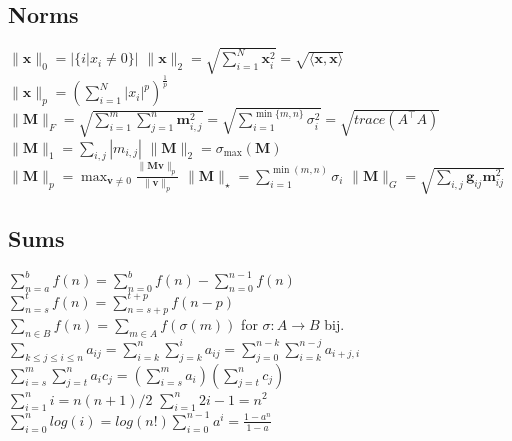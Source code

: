 \subsection*{Norms}
$\|\mathbf{x}\|_0 = |\{i | x_i \neq 0\}|$ \qquad $\|\mathbf{x}\|_2 = \sqrt{\sum_{i=1}^{N} \mathbf{x}_i^2} = \sqrt{\langle \mathbf{x}, \mathbf{x} \rangle}$\\
$\|\mathbf{x}\|_p = \left( \sum_{i=1}^{N} |x_i|^p \right)^{\frac{1}{p}}$\\
$\|\mathbf{M}\|_F =\allowbreak \sqrt{\sum_{i=1}^{m} \sum_{j=1}^{n}\mathbf{m}_{i,j}^2} =\allowbreak \sqrt{\sum_{i=1}^{\min\{m, n\}} \sigma_i^2} = \sqrt{trace(A^\top A)}$\\
$\|\mathbf{M}\|_1 = \sum_{i,j} | m_{i,j}|$ \qquad $\|\mathbf{M}\|_2 = \sigma_{\text{max}}(\mathbf{M})$\\
$\|\mathbf{M}\|_p = \max_{\mathbf{v} \neq 0} \frac{\|\mathbf{M}\mathbf{v}\|_p}{\|\mathbf{v}\|_p}$ \qquad $\|\mathbf{M}\|_\star = \sum_{i=1}^{\min(m, n)} \sigma_i$ \qquad $\|\mathbf{M}\|_G = \sqrt{\sum_{i,j} \mathbf{g}_{ij} \mathbf{m}_{ij}^2}$

\subsection*{Sums}
$\sum_{n=a}^b f(n) = \sum_{n=0}^b f(n) - \sum_{n=0}^{n-1} f(n)$\\
$\sum_{n=s}^{t} f(n)=\sum_{n=s+p}^{t+p}f(n-p)$\\
$\sum_{n\in B} f(n) = \sum_{m\in A} f(\sigma (m))$ for $\sigma : A\rightarrow B$ bij.\\
$\sum_{k\leq j \leq i \leq n}a_{ij} = \sum_{i=k}^n \sum_{j=k}^i a_{ij} = \sum_{j=0}^{n-k}\sum_{i=k}^{n-j} a_{i+j, i}$\\
$\sum_{i=s}^m \sum_{j=t}^n a_i c_j = (\sum_{i=s}^m a_i)(\sum_{j=t}^n c_j)$\\
$\sum_{i=1}^n i = n(n+1)/2$ \qquad $\sum_{i=1}^n 2i-1 = n^2$\\
$\sum_{i=0}^n log(i) = log(n!)$\qquad $\sum_{i=0}^{n-1} a^i=\frac{1-a^n}{1-a}$

